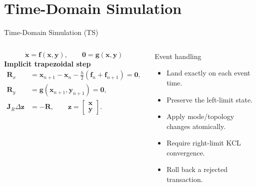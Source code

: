 \documentclass{beamer}
\begin{document}
\section{Time-Domain Simulation}
\begin{frame}{Time-Domain Simulation (TS)}
\begin{columns}[t,onlytextwidth]
\footnotesize
\[
\dot{\bm{x}}=\bm{f}(\bm{x},\bm{y}),\qquad
\bm{0}=\bm{g}(\bm{x},\bm{y})
\]
\textbf{Implicit trapezoidal step}
\begin{align*}
\bm{R}_x &= \bm{x}_{n+1}-\bm{x}_{n}
-\frac{h}{2}\left(\bm{f}_{n}+\bm{f}_{n+1}\right)=\bm{0},\\
\bm{R}_y &= \bm{g}(\bm{x}_{n+1},\bm{y}_{n+1})=\bm{0},\\
\bm{J}_R\Delta\bm{z} &= -\bm{R},\qquad
\bm{z}=\begin{bmatrix}\bm{x}\\\bm{y}\end{bmatrix}.
\end{align*}
\scriptsize
\begin{block}{Event handling}
\begin{itemize}
  \item Land exactly on each event time.
  \item Preserve the left-limit state.
  \item Apply mode/topology changes atomically.
  \item Require right-limit KCL convergence.
  \item Roll back a rejected transaction.
\end{itemize}
\end{block}
\end{columns}
\end{frame}
\end{document}
